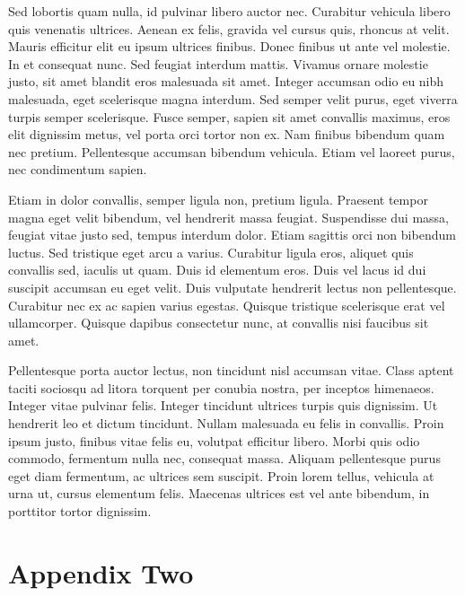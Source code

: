 \documentclass[12pt]{article}
\begin{document}
Sed lobortis quam nulla, id pulvinar libero auctor nec. Curabitur vehicula libero quis venenatis ultrices. Aenean ex felis, gravida vel cursus quis, rhoncus at velit. Mauris efficitur elit eu ipsum ultrices finibus. Donec finibus ut ante vel molestie. In et consequat nunc. Sed feugiat interdum mattis. Vivamus ornare molestie justo, sit amet blandit eros malesuada sit amet. Integer accumsan odio eu nibh malesuada, eget scelerisque magna interdum. Sed semper velit purus, eget viverra turpis semper scelerisque. Fusce semper, sapien sit amet convallis maximus, eros elit dignissim metus, vel porta orci tortor non ex. Nam finibus bibendum quam nec pretium. Pellentesque accumsan bibendum vehicula. Etiam vel laoreet purus, nec condimentum sapien.

Etiam in dolor convallis, semper ligula non, pretium ligula. Praesent tempor magna eget velit bibendum, vel hendrerit massa feugiat. Suspendisse dui massa, feugiat vitae justo sed, tempus interdum dolor. Etiam sagittis orci non bibendum luctus. Sed tristique eget arcu a varius. Curabitur ligula eros, aliquet quis convallis sed, iaculis ut quam. Duis id elementum eros. Duis vel lacus id dui suscipit accumsan eu eget velit. Duis vulputate hendrerit lectus non pellentesque. Curabitur nec ex ac sapien varius egestas. Quisque tristique scelerisque erat vel ullamcorper. Quisque dapibus consectetur nunc, at convallis nisi faucibus sit amet.

Pellentesque porta auctor lectus, non tincidunt nisl accumsan vitae. Class aptent taciti sociosqu ad litora torquent per conubia nostra, per inceptos himenaeos. Integer vitae pulvinar felis. Integer tincidunt ultrices turpis quis dignissim. Ut hendrerit leo et dictum tincidunt. Nullam malesuada eu felis in convallis. Proin ipsum justo, finibus vitae felis eu, volutpat efficitur libero. Morbi quis odio commodo, fermentum nulla nec, consequat massa. Aliquam pellentesque purus eget diam fermentum, ac ultrices sem suscipit. Proin lorem tellus, vehicula at urna ut, cursus elementum felis. Maecenas ultrices est vel ante bibendum, in porttitor tortor dignissim.



\newpage
\section{Appendix Two
\label{sec:appendix:two}}
\renewcommand{\thetable}{C\arabic{table}}
\setcounter{table}{0}
\renewcommand{\thefigure}{C\arabic{figure}}
\setcounter{figure}{0}
\end{document}
